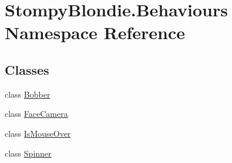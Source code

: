 \hypertarget{namespace_stompy_blondie_1_1_behaviours}{}\section{Stompy\+Blondie.\+Behaviours Namespace Reference}
\label{namespace_stompy_blondie_1_1_behaviours}
\subsection*{Classes}
\begin{DoxyCompactItemize}
\item 
class \mbox{\hyperlink{class_stompy_blondie_1_1_behaviours_1_1_bobber}{Bobber}}
\item 
class \mbox{\hyperlink{class_stompy_blondie_1_1_behaviours_1_1_face_camera}{Face\+Camera}}
\item 
class \mbox{\hyperlink{class_stompy_blondie_1_1_behaviours_1_1_is_mouse_over}{Is\+Mouse\+Over}}
\item 
class \mbox{\hyperlink{class_stompy_blondie_1_1_behaviours_1_1_spinner}{Spinner}}
\end{DoxyCompactItemize}
